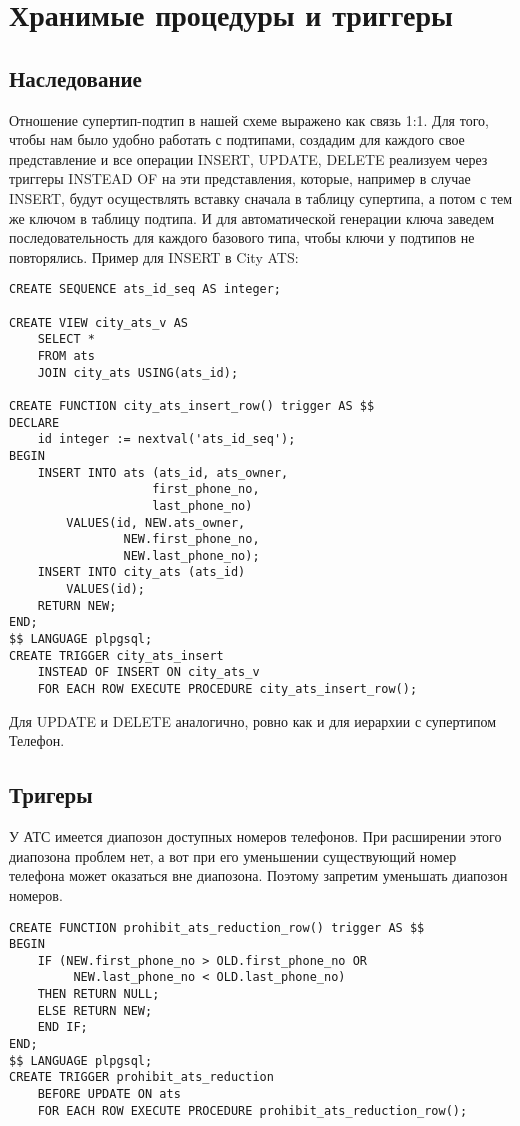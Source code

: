 \documentclass{report}
\begin{document}
\chapter{Хранимые процедуры и триггеры}

\section{Наследование}

Отношение супертип-подтип в нашей схеме выражено как связь 1:1. 
Для того, чтобы нам было удобно работать с подтипами, создадим
для каждого свое представление и все операции INSERT, UPDATE, DELETE
реализуем через триггеры INSTEAD OF на эти представления, которые,
например в случае INSERT, будут осуществлять вставку сначала в 
таблицу супертипа, а потом с тем же ключом в таблицу подтипа.
И для автоматической генерации ключа заведем последовательность 
для каждого базового типа, чтобы ключи у подтипов не повторялись.
Пример для INSERT в City ATS:
\begin{lstlisting}
CREATE SEQUENCE ats_id_seq AS integer;

CREATE VIEW city_ats_v AS
    SELECT *
    FROM ats 
    JOIN city_ats USING(ats_id); 

CREATE FUNCTION city_ats_insert_row() trigger AS $$
DECLARE
    id integer := nextval('ats_id_seq');
BEGIN
    INSERT INTO ats (ats_id, ats_owner, 
                    first_phone_no, 
                    last_phone_no)
        VALUES(id, NEW.ats_owner, 
                NEW.first_phone_no, 
                NEW.last_phone_no);
    INSERT INTO city_ats (ats_id)
        VALUES(id);
    RETURN NEW;
END;
$$ LANGUAGE plpgsql;
CREATE TRIGGER city_ats_insert 
    INSTEAD OF INSERT ON city_ats_v
    FOR EACH ROW EXECUTE PROCEDURE city_ats_insert_row();
\end{lstlisting}

Для UPDATE и DELETE аналогично, ровно как и для иерархии с супертипом
Телефон.

\section{Тригеры}

У АТС имеется диапозон доступных номеров телефонов. При расширении этого 
диапозона проблем нет, а вот при его уменьшении существующий номер 
телефона может оказаться вне диапозона. Поэтому запретим уменьшать 
диапозон номеров.

\begin{lstlisting}
CREATE FUNCTION prohibit_ats_reduction_row() trigger AS $$
BEGIN
    IF (NEW.first_phone_no > OLD.first_phone_no OR
         NEW.last_phone_no < OLD.last_phone_no)
    THEN RETURN NULL;
    ELSE RETURN NEW;
    END IF;
END;
$$ LANGUAGE plpgsql;
CREATE TRIGGER prohibit_ats_reduction 
    BEFORE UPDATE ON ats
    FOR EACH ROW EXECUTE PROCEDURE prohibit_ats_reduction_row();
\end{lstlisting}
\end{document}
